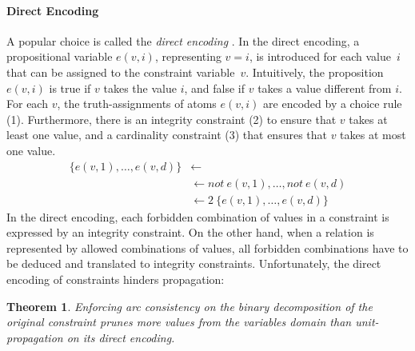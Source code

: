 \documentclass[letterpaper]{article}
\newtheorem{theorem}{Theorem}
\newcommand{\dneg}{not\ }
\begin{document}
\paragraph{Direct Encoding}
A popular choice is called the \emph{direct encoding} \cite{wa00}. In the direct encoding, a propositional variable $e(v, i)$, representing $v = i$, is introduced for each value~$i$ that can be assigned to the constraint variable~$v$. Intuitively, the proposition $e(v, i)$ is true if $v$ takes the value $i$, and false if $v$ takes a value different from $i$. For each $v$, the truth-assignments of atoms $e(v, i)$ are encoded by a choice rule (1). Furthermore, there is an integrity constraint (2) to ensure that $v$ takes at least one value, and a cardinality constraint (3) that ensures that $v$ takes at most one value.
\begin{align}
\{ e(v, 1), \dots, e(v, d) \} &\leftarrow \\
&\leftarrow \dneg e(v, 1), \dots, \dneg e(v, d) \\
&\leftarrow 2\ \{ e(v, 1), \dots, e(v, d) \}
\end{align}
In the direct encoding, each forbidden combination of values in a constraint is expressed by an integrity constraint. On the other hand, when a relation is represented by allowed combinations of values, all forbidden combinations have to be deduced and translated to integrity constraints. Unfortunately, the direct encoding of constraints hinders propagation:
\begin{theorem}
Enforcing arc consistency on the binary decomposition of the original constraint prunes more values from the variables domain than unit-propagation on its direct encoding.
\end{theorem}
\end{document}
